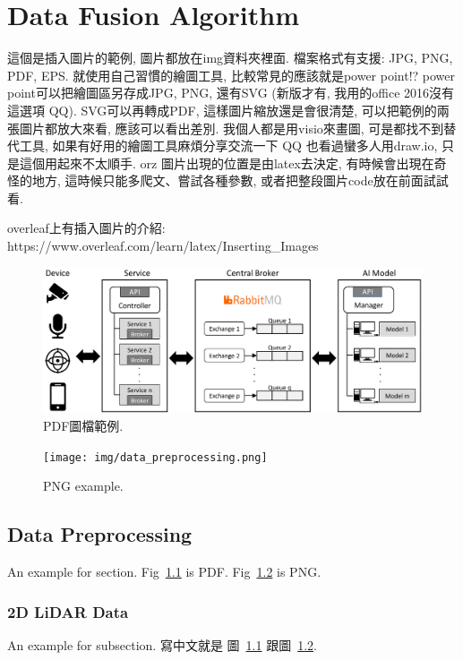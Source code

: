 \chapter{Data Fusion Algorithm}
\label{ch:method}

這個是插入圖片的範例, 圖片都放在img資料夾裡面. 檔案格式有支援: JPG, PNG, PDF, EPS. 就使用自己習慣的繪圖工具, 比較常見的應該就是power point!? power point可以把繪圖區另存成JPG, PNG, 還有SVG (新版才有, 我用的office 2016沒有這選項 QQ). SVG可以再轉成PDF, 這樣圖片縮放還是會很清楚, 可以把範例的兩張圖片都放大來看, 應該可以看出差別. 我個人都是用visio來畫圖, 可是都找不到替代工具, 如果有好用的繪圖工具麻煩分享交流一下 QQ 也看過蠻多人用draw.io, 只是這個用起來不太順手. orz
圖片出現的位置是由latex去決定, 有時候會出現在奇怪的地方, 這時候只能多爬文、嘗試各種參數, 或者把整段圖片code放在前面試試看.

overleaf上有插入圖片的介紹: https://www.overleaf.com/learn/latex/Inserting\_Images


    \begin{figure}
      \centering
      \includegraphics[width=1\columnwidth]{img/1.system_architecture.pdf}
      \caption{PDF圖檔範例.} 
      \vspace{-0.4cm}
      \label{fig:system_architecture}
    \end{figure}

\begin{figure}[htb]
	\centering
	\texttt{[image: img/data\_preprocessing.png]}
	\caption{PNG example.}
	\label{fig:model}
\end{figure}

\section{Data Preprocessing}
\label{sec:SMA}
An example for section. Fig~\ref{fig:system_architecture} is PDF. Fig~\ref{fig:model} is PNG.


\subsection{2D LiDAR Data}
An example for subsection. 寫中文就是 圖~\ref{fig:system_architecture} 跟圖~\ref{fig:model}.
